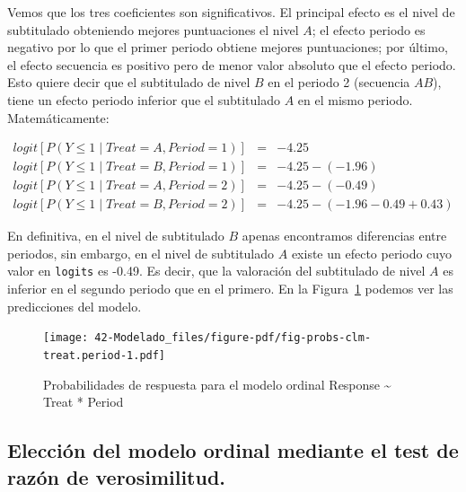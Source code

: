 \documentclass[
  12pt,
  a4paper,
  extrafontsizes,
  onecolumn,
  openright]{memoir}
\begin{document}
\normalsize

Vemos que los tres coeficientes son significativos. El principal efecto
es el nivel de subtitulado obteniendo mejores puntuaciones el nivel
\(A\); el efecto periodo es negativo por lo que el primer periodo
obtiene mejores puntuaciones; por último, el efecto secuencia es
positivo pero de menor valor absoluto que el efecto periodo. Esto quiere
decir que el subtitulado de nivel \(B\) en el periodo 2 (secuencia
\(AB\)), tiene un efecto periodo inferior que el subtitulado \(A\) en el
mismo periodo. Matemáticamente:

\[
\begin{aligned}
logit [P(Y \le 1 \mid Treat = A, Period = 1)] & = & -4.25 \\
logit [P(Y \le 1 \mid Treat = B, Period = 1)] & = & -4.25 - (-1.96) \\
logit [P(Y \le 1 \mid Treat = A, Period = 2)] & = & -4.25 - (-0.49) \\
logit [P(Y \le 1 \mid Treat = B, Period = 2)] & = & -4.25 -(-1.96 -0.49 + 0.43)
\end{aligned}
\]

En definitiva, en el nivel de subtitulado \(B\) apenas encontramos
diferencias entre periodos, sin embargo, en el nivel de subtitulado
\(A\) existe un efecto periodo cuyo valor en \texttt{logits} es -0.49.
Es decir, que la valoración del subtitulado de nivel \(A\) es inferior
en el segundo periodo que en el primero. En la
Figura~\ref{fig-probs-clm-treat.period} podemos ver las predicciones del
modelo.

\begin{figure}[h]

{\centering \texttt{[image: 42-Modelado\_files/figure-pdf/fig-probs-clm-treat.period-1.pdf]}

}

\caption{\label{fig-probs-clm-treat.period}Probabilidades de respuesta
para el modelo ordinal Response \textasciitilde{} Treat * Period}

\end{figure}

\hypertarget{elecciuxf3n-del-modelo-ordinal-mediante-el-test-de-razuxf3n-de-verosimilitud.}{%
\subsection{Elección del modelo ordinal mediante el test de razón de
verosimilitud.}\label{elecciuxf3n-del-modelo-ordinal-mediante-el-test-de-razuxf3n-de-verosimilitud.}}
\end{document}
